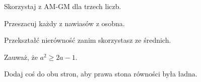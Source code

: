 
\begin{hints_list}
	\item Skorzystaj z AM-GM dla trzech liczb.
	\item Przeszacuj każdy z nawiasów z osobna.
	\item Przekształć nierówność zanim skorzystasz ze średnich.
	\item Zauważ, że $a^2 \geqslant 2a - 1$.
	\item Dodaj coś do obu stron, aby prawa stona równości była ładna.
\end{hints_list}